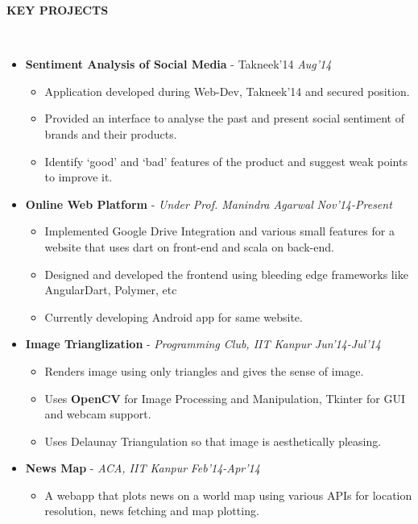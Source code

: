 \documentclass[a4paper,10pt]{article}
\newcommand{\lsep}{-0.5cm}
\newcommand{\resheading}[1]{{\small \colorbox{mygrey}{\begin{minipage}{0.975\textwidth}{\textbf{#1 \vphantom{p\^{E}}}}\end{minipage}}}}
\begin{document}
        \resheading{\textbf{KEY PROJECTS} }\\[\lsep]
        \begin{itemize} \itemsep -1mm
        \item  \textbf{Sentiment Analysis of Social Media} - {\footnotesize
            Takneek'14 }   \hfill \textit{ Aug'14
}          \vspace{-2mm}\begin{itemize} \itemsep -2pt
          \item Application developed during Web-Dev, Takneek'14 and secured \textbf{} position.
          \item Provided an interface to analyse the past and present social sentiment of brands and their products.
          \item  Identify `good' and `bad' features of the product and suggest weak points to improve it.
          \end{itemize}
        \item
          \textbf{Online Web Platform} - \textit{Under Prof. Manindra Agarwal}
          \hfill \textit{Nov'14-Present}
          \vspace{-2mm}\begin{itemize} \itemsep -2pt
\item Implemented Google Drive
          Integration and various
          small features for a website
          that uses dart on front-end
          and scala on back-end. 
\item Designed and developed the frontend using bleeding edge frameworks like AngularDart, Polymer, etc 
\item Currently
          developing Android app for
          same website.
\end{itemize}
        \item
          \textbf{Image Trianglization} - \textit{ Programming Club, IIT Kanpur }                  \hfill \textit{Jun'14-Jul'14}
          \vspace{-2mm}\begin{itemize}  \itemsep -2pt
          \item Renders image using only triangles and gives the sense of image.
          \item Uses \textbf{OpenCV} for Image Processing and Manipulation,
            Tkinter for GUI and webcam support.
          \item Uses Delaunay Triangulation so that image is aesthetically pleasing.
          \end{itemize}
        \item
          \textbf{News Map} - \textit{ ACA, IIT Kanpur }
          \hfill  \textit{Feb'14-Apr'14}
          \vspace{-2mm}\begin{itemize} \itemsep -2pt
          \item A webapp that plots news on a world map  using various APIs for location resolution, news fetching and map plotting.
          \end{itemize}
        \end{itemize}
\end{document}
